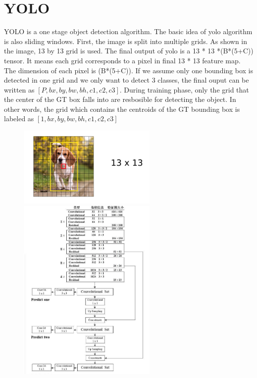 \documentclass[11pt]{elegantpaper}
\begin{document}
\section{YOLO}
YOLO is a one stage object detection algorithm. The basic idea of yolo algorithm is also sliding windows. First, the image is split into multiple grids. As shown in the image, 13 by 13 grid is used.
The final output of yolo is a  13 * 13 *(B*(5+C)) tensor. It means each grid corresponds to a pixel in final 13 * 13 feature map. The dimension of each pixel is (B*(5+C)). If we assume only one bounding box is detected in one grid 
and we only want to detect 3 classes, the final ouput can be written as $[P, bx,by,bw,bh,c1,c2,c3]$. During training phase, only the grid that the center of the GT box falls into are resbosible for detecting the object. In other words,
the grid which contains the centroids of the GT bounding box is labeled as $[1, bx,by,bw,bh,c1,c2,c3]$

\begin{figure}[htbp]
	\centering
    \includegraphics[width=0.6\textwidth]{image/dog.png}
    \includegraphics[width=0.6\textwidth]{image/yolo.png}

\end{figure}
\end{document}
